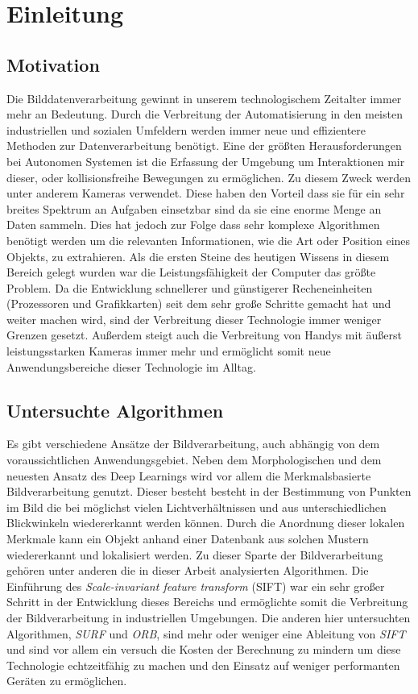 \chapter{Einleitung}
\section{Motivation}

Die Bilddatenverarbeitung gewinnt in unserem technologischem Zeitalter immer mehr an Bedeutung. 
Durch die Verbreitung der Automatisierung in den meisten industriellen und sozialen Umfeldern werden immer neue und effizientere Methoden zur Datenverarbeitung benötigt.
Eine der größten Herausforderungen bei Autonomen Systemen ist die Erfassung der Umgebung um Interaktionen mir dieser, oder kollisionsfreihe Bewegungen zu ermöglichen. 
Zu diesem Zweck werden unter anderem Kameras verwendet.
Diese haben den Vorteil dass sie für ein sehr breites Spektrum an Aufgaben einsetzbar sind da sie eine enorme Menge an Daten sammeln.
Dies hat jedoch zur Folge dass sehr komplexe Algorithmen benötigt werden um die relevanten Informationen, wie die Art oder Position eines Objekts, zu extrahieren.
Als die ersten Steine des heutigen Wissens in diesem Bereich gelegt wurden war die Leistungsfähigkeit der Computer das größte Problem.
Da die Entwicklung schnellerer und günstigerer Recheneinheiten (Prozessoren und Grafikkarten) seit dem sehr große Schritte gemacht hat und weiter machen wird, sind der Verbreitung dieser Technologie immer weniger Grenzen gesetzt.
Außerdem steigt auch die Verbreitung von Handys mit äußerst leistungsstarken Kameras immer mehr und ermöglicht somit neue Anwendungsbereiche dieser Technologie im Alltag.

\section{Untersuchte Algorithmen}

Es gibt verschiedene Ansätze der Bildverarbeitung, auch abhängig von dem voraussichtlichen Anwendungsgebiet.
Neben dem Morphologischen und dem neuesten Ansatz des Deep Learnings wird vor allem die Merkmalsbasierte Bildverarbeitung genutzt.
Dieser besteht besteht in der Bestimmung von Punkten im Bild die bei möglichst vielen Lichtverhältnissen und aus unterschiedlichen Blickwinkeln wiedererkannt werden können.
Durch die Anordnung dieser lokalen Merkmale kann ein Objekt anhand einer Datenbank aus solchen Mustern wiedererkannt und lokalisiert werden.
Zu dieser Sparte der Bildverarbeitung gehören unter anderen die in dieser Arbeit analysierten Algorithmen.
Die Einführung des \emph{Scale-invariant feature transform} (SIFT) war ein sehr großer Schritt in der Entwicklung dieses Bereichs und ermöglichte somit die Verbreitung der Bildverarbeitung in industriellen Umgebungen.
Die anderen hier untersuchten Algorithmen, \emph{SURF} und \emph{ORB}, sind mehr oder weniger eine Ableitung von \emph{SIFT} und sind vor allem ein versuch die Kosten der Berechnung zu mindern um diese Technologie echtzeitfähig zu machen und den Einsatz auf weniger performanten Geräten zu ermöglichen.

